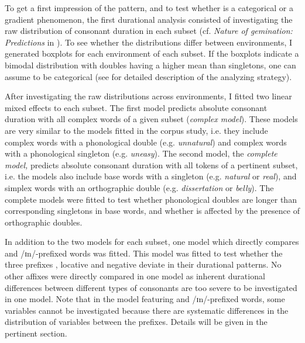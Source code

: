 To get a first impression of the  pattern, and to test whether  is a categorical or a gradient phenomenon, the first durational analysis consisted of investigating the raw distribution of consonant duration in each subset (cf. \textit{Nature of {gemination}: Predictions }in ). To see whether the distributions differ between environments, I generated boxplots for each environment of each subset. 
If the boxplots indicate a bimodal distribution with doubles having a higher mean than singletons, one can assume  to be categorical (see  for detailed description of the analyzing strategy). 

After investigating the raw distributions across environments, I fitted two linear mixed effects  to each subset. 
The first model predicts absolute consonant duration with all complex words of a given subset (\textit{complex model}). These models are very similar to the models fitted in the corpus study, i.e. they include complex words with a phonological double (e.g. \textit{unnatural}) and complex words with a phonological singleton (e.g. \textit{uneasy}). 
The second model, the \textit{complete model,} predicts absolute consonant duration with all tokens of a pertinent subset, i.e. the models also include base words with a singleton (e.g. \textit{natural} or \textit{real}), and simplex words with an orthographic double (e.g. \textit{dissertation} or \textit{belly}). The complete models were fitted to test whether phonological doubles are longer than corresponding singletons in base words, and whether  is affected by the presence of orthographic doubles. 

In addition to the two models for each subset, one model which directly compares  and /ɪn/-prefixed words was fitted. This model was fitted to test whether the three prefixes , locative  and negative  deviate in their durational patterns. No other affixes were directly compared in one model as inherent durational differences between different types of consonants are too severe to be investigated in one model. Note that in the model featuring  and /ɪn/-prefixed words, some variables cannot be investigated because there are systematic differences in the distribution of variables between the prefixes. Details will be given in the pertinent section.


